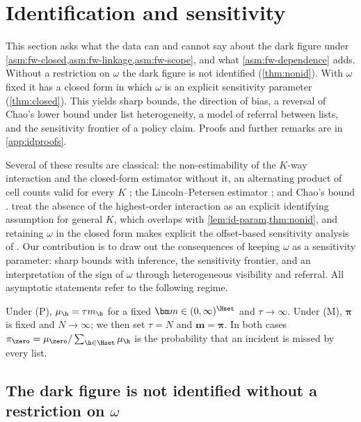 \section{Identification and sensitivity}\label{sec:identification}

This section asks what the data can and cannot say about the dark figure under \cref{asm:fw-closed,asm:fw-linkage,asm:fw-scope}, and what \cref{asm:fw-dependence} adds. Without a restriction on $\omega$ the dark figure is not identified (\cref{thm:nonid}). With $\omega$ fixed it has a closed form in which $\omega$ is an explicit sensitivity parameter (\cref{thm:closed}). This yields sharp bounds, the direction of bias, a reversal of Chao's lower bound under list heterogeneity, a model of referral between lists, and the sensitivity frontier of a policy claim. Proofs and further remarks are in \cref{app:idproofs}.

Several of these results are classical: the non-estimability of the $K$-way interaction and the closed-form estimator without it, an alternating product of cell counts valid for every $K$ \citep{fienberg1972,bishop1975}; the Lincoln--Petersen estimator \citep{petersen1896,lincoln1930}; and Chao's bound \citep{chao1987}.  treat the absence of the highest-order interaction as an explicit identifying assumption for general $K$, which overlaps with \cref{lem:id-param,thm:nonid}, and retaining $\omega$ in the closed form makes explicit the offset-based sensitivity analysis of \citet{gerritse2015}. Our contribution is to draw out the consequences of keeping $\omega$ as a sensitivity parameter: sharp bounds with inference, the sensitivity frontier, and an interpretation of the sign of $\omega$ through heterogeneous visibility and referral. All asymptotic statements refer to the following regime.

\begin{definition}\label{def:id-regime}
Under (P), $\mu_{\h}=\tau m_{\h}$ for a fixed $\bm m\in(0,\infty)^{\Hset}$ and $\tau\to\infty$. Under (M), $\bm\pi$ is fixed and $N\to\infty$; we then set $\tau=N$ and $\bm m=\bm\pi$. In both cases $\pi_{\zero}=\mu_{\zero}/\sum_{\h\in\Hset}\mu_{\h}$ is the probability that an incident is missed by every list.
\end{definition}

\subsection{The dark figure is not identified without a restriction on \texorpdfstring{$\omega$}{omega}}\label{sec:id-nonid}

